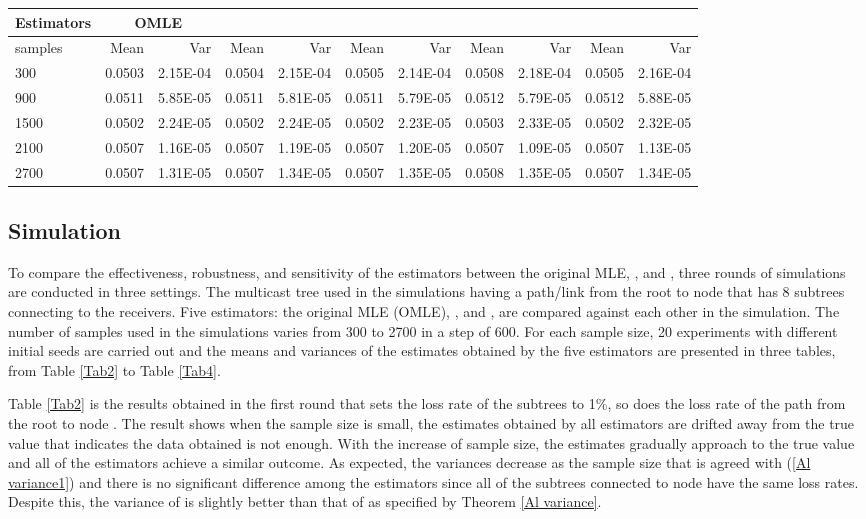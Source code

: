 \documentclass[10pt,onecolumn]{IEEEtran}
\begin{document}
\begin{table*}
\centering
\scriptsize
\begin{tabular}{|l|r|r|r|r|r|r|r|r|r|r|}  \hline
 Estimators &\multicolumn{2}{|c|}{OMLE} & \multicolumn{2}{|c|}{} & \multicolumn{2}{|c|}{} &\multicolumn{2}{|c|}{} & \multicolumn{2}{|c|}{}	\\ \hline
samples & Mean & Var &	Mean & Var &	Mean & Var	& Mean & Var &  Mean &	Var	\\ \hline
300&	0.0503&	2.15E-04&	0.0504&	2.15E-04&	0.0505&	2.14E-04&	0.0508&	2.18E-04&	0.0505&	2.16E-04\\ \hline
900&	0.0511&	5.85E-05&	0.0511&	5.81E-05&	0.0511&	5.79E-05&	0.0512&	5.79E-05&	0.0512&	5.88E-05\\ \hline
1500&	0.0502&	2.24E-05&	0.0502&	2.24E-05&	0.0502&	2.23E-05&	0.0503&	2.33E-05&	0.0502&	2.32E-05\\ \hline
2100&	0.0507&	1.16E-05&	0.0507&	1.19E-05&	0.0507&	1.20E-05&	0.0507&	1.09E-05&	0.0507&	1.13E-05\\ \hline
2700&	0.0507&	1.31E-05&	0.0507&	1.34E-05&	0.0507&	1.35E-05&	0.0508&	1.35E-05&	0.0507&	1.34E-05\\ \hline
\end{tabular}
  \caption{Simulation Result of a 8-Descendant Tree, the loss rate of the root link=, 4 of the 8 have Loss Rate= and the other 4 have Loss Rate=}
  \label{Tab4}
\end{table*}



\subsection{Simulation}

To compare the effectiveness, robustness, and sensitivity of the estimators between the original MLE, , and , three rounds of simulations are conducted in three settings. The multicast tree used in the simulations having a path/link from the root to node  that has 8 subtrees connecting to the receivers. Five estimators: the original MLE (OMLE), ,  and , are compared against each other in the simulation. The number of samples used in the simulations varies from 300 to 2700 in a step of 600. For each sample size, 20 experiments with different initial seeds are carried out and the means and variances of the estimates obtained by the five estimators are presented in three tables, from Table \ref{Tab2} to Table \ref{Tab4}.

 Table \ref{Tab2} is the results obtained in the first round that sets the loss rate of the subtrees to 1\%, so does the loss rate of the path from the root to node .  The result shows when the sample size is small, the estimates obtained by all estimators are drifted away from the true value that indicates the data obtained is not enough. With the increase of sample size, the estimates gradually approach to the true value and all of the estimators achieve a  similar outcome. As expected, the variances decrease as the sample size that is agreed with (\ref{Al variance1}) and there is no significant difference among the estimators since all of the subtrees connected to node  have the same loss rates. Despite this, the variance of  is slightly better than that of  as specified by Theorem \ref{Al variance}.
\end{document}
